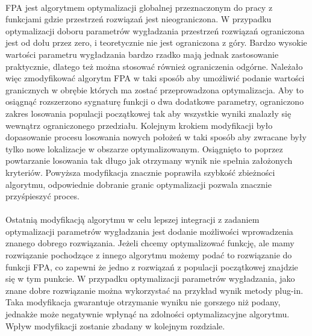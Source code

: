 \documentclass[a4paper,12pt,twoside]{article}
\begin{document}
\paragraph{}
FPA jest algorytmem optymalizacji globalnej przeznaczonym do pracy z funkcjami gdzie przestrzeń rozwiązań jest nieograniczona. W przypadku optymalizacji doboru parametrów wygładzania przestrzeń rozwiązań ograniczona jest od dołu przez zero, i teoretycznie nie jest ograniczona z góry. Bardzo wysokie wartości parametru wygładzania bardzo rzadko mają jednak zastosowanie praktycznie, dlatego też można stosować również ograniczenia odgórne. Należało więc zmodyfikować algorytm FPA w taki sposób aby umożliwić podanie wartości granicznych w obrębie których ma zostać przeprowadzona optymalizacja. Aby to osiągnąć rozszerzono sygnaturę funkcji o dwa dodatkowe parametry, ograniczono zakres losowania populacji początkowej tak aby wszystkie wyniki znalazły się wewnątrz ograniczonego przedziału. Kolejnym krokiem modyfikacji było dopasowanie procesu losowania nowych położeń w taki sposób aby zwracane były tylko nowe lokalizacje w obszarze optymalizowanym. Osiągnięto to poprzez powtarzanie losowania tak długo jak otrzymany wynik nie spełnia założonych kryteriów.  Powyższa modyfikacja znacznie poprawiła szybkość zbieżności algorytmu, odpowiednie dobranie granic optymalizacji pozwala znacznie przyśpieszyć proces. 
\paragraph{}
Ostatnią modyfikacją algorytmu w celu lepszej integracji z zadaniem optymalizacji parametrów wygładzania jest dodanie możliwości wprowadzenia znanego dobrego rozwiązania. Jeżeli chcemy optymalizować funkcję, ale mamy rozwiązanie pochodzące z innego algorytmu możemy podać to rozwiązanie do funkcji FPA, co zapewni że jedno z rozwiązań z populacji początkowej znajdzie się w tym punkcie. W przypadku optymalizacji parametrów wygładzania, jako znane dobre rozwiązanie można wykorzystać na przykład wynik metody plug-in.  Taka modyfikacja gwarantuje otrzymanie wyniku nie gorszego niż podany, jednakże może negatywnie wpłynąć na zdolności optymalizacyjne algorytmu. Wpływ modyfikacji zostanie zbadany w kolejnym rozdziale. 
\newpage
\thispagestyle{empty}
\mbox{}

\newpage
\end{document}
